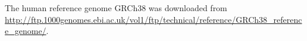 \documentclass[pdflatex, sn-mathphys-num, lineno]{sn-jnl}%
\theoremstyle{thmstyleone}%
\theoremstyle{thmstyletwo}%
\theoremstyle{thmstylethree}%
\begin{document}





The human reference genome GRCh38 was downloaded from \url{http://ftp.1000genomes.ebi.ac.uk/vol1/ftp/technical/reference/GRCh38\_reference\_genome/}.
\end{document}
